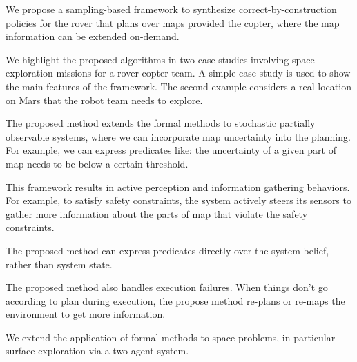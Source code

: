 \documentclass[conference]{IEEEtran}
\begin{document}
\begin{enumerate}
{	%
	\item We propose a sampling-based framework to synthesize 
	correct-by-construction policies for the rover that plans over maps provided
	the copter, where the map information can be extended on-demand.
	
	\item We highlight the proposed algorithms in two case studies involving
	space exploration missions for a rover-copter team.
	A simple case study is used to show the main features of the framework.
	The second example considers a real location on Mars that the robot team
	needs to explore.
	}
	
	\item The proposed method extends the formal methods to stochastic partially observable systems, where we can incorporate map uncertainty into the planning. For example, we can express predicates like: the uncertainty of a given part of map needs to be below a certain threshold.
	
	\item This framework results in active perception and information gathering behaviors. For example, to satisfy safety constraints, the system actively steers its sensors to gather more information about the parts of map that violate the safety constraints.
	
	\item The proposed method can express predicates directly over the system belief, rather than system state.
	
	\item The proposed method also handles execution failures. When things don't go according to plan during execution, the propose method re-plans or re-maps the environment to get more information.
	
	\item We extend the application of formal methods to space problems, in particular surface exploration via a two-agent system.
	\end{enumerate}
	
\end{document}
